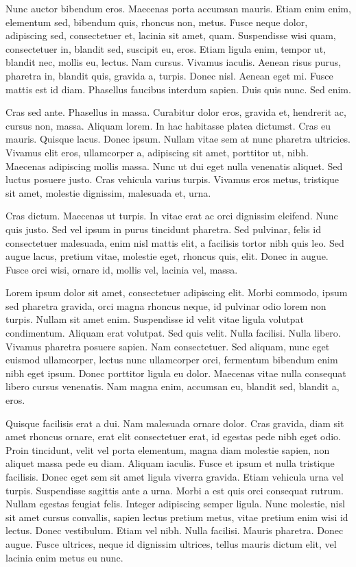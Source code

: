 Nunc auctor bibendum eros. Maecenas porta accumsan mauris. Etiam enim enim, elementum sed, bibendum quis, rhoncus non, metus. Fusce neque dolor, adipiscing sed, consectetuer et, lacinia sit amet, quam. Suspendisse wisi quam, consectetuer in, blandit sed, suscipit eu, eros. Etiam ligula enim, tempor ut, blandit nec, mollis eu, lectus. Nam cursus. Vivamus iaculis. Aenean risus purus, pharetra in, blandit quis, gravida a, turpis. Donec nisl. Aenean eget mi. Fusce mattis est id diam. Phasellus faucibus interdum sapien. Duis quis nunc. Sed enim.


Cras sed ante. Phasellus in massa. Curabitur dolor eros, gravida et, hendrerit ac, cursus non, massa. Aliquam lorem. In hac habitasse platea dictumst. Cras eu mauris. Quisque lacus. Donec ipsum. Nullam vitae sem at nunc pharetra ultricies. Vivamus elit eros, ullamcorper a, adipiscing sit amet, porttitor ut, nibh. Maecenas adipiscing mollis massa. Nunc ut dui eget nulla venenatis aliquet. Sed luctus posuere justo. Cras vehicula varius turpis. Vivamus eros metus, tristique sit amet, molestie dignissim, malesuada et, urna.

Cras dictum. Maecenas ut turpis. In vitae erat ac orci dignissim eleifend. Nunc quis justo. Sed vel ipsum in purus tincidunt pharetra. Sed pulvinar, felis id consectetuer malesuada, enim nisl mattis elit, a facilisis tortor nibh quis leo. Sed augue lacus, pretium vitae, molestie eget, rhoncus quis, elit. Donec in augue. Fusce orci wisi, ornare id, mollis vel, lacinia vel, massa.

Lorem ipsum dolor sit amet, consectetuer adipiscing elit. Morbi commodo, ipsum sed pharetra gravida, orci magna rhoncus neque, id pulvinar odio lorem non turpis. Nullam sit amet enim. Suspendisse id velit vitae ligula volutpat condimentum. Aliquam erat volutpat. Sed quis velit. Nulla facilisi. Nulla libero. Vivamus pharetra posuere sapien. Nam consectetuer. Sed aliquam, nunc eget euismod ullamcorper, lectus nunc ullamcorper orci, fermentum bibendum enim nibh eget ipsum. Donec porttitor ligula eu dolor. Maecenas vitae nulla consequat libero cursus venenatis. Nam magna enim, accumsan eu, blandit sed, blandit a, eros.

Quisque facilisis erat a dui. Nam malesuada ornare dolor. Cras gravida, diam sit amet rhoncus ornare, erat elit consectetuer erat, id egestas pede nibh eget odio. Proin tincidunt, velit vel porta elementum, magna diam molestie sapien, non aliquet massa pede eu diam. Aliquam iaculis. Fusce et ipsum et nulla tristique facilisis. Donec eget sem sit amet ligula viverra gravida. Etiam vehicula urna vel turpis. Suspendisse sagittis ante a urna. Morbi a est quis orci consequat rutrum. Nullam egestas feugiat felis. Integer adipiscing semper ligula. Nunc molestie, nisl sit amet cursus convallis, sapien lectus pretium metus, vitae pretium enim wisi id lectus. Donec vestibulum. Etiam vel nibh. Nulla facilisi. Mauris pharetra. Donec augue. Fusce ultrices, neque id dignissim ultrices, tellus mauris dictum elit, vel lacinia enim metus eu nunc.

